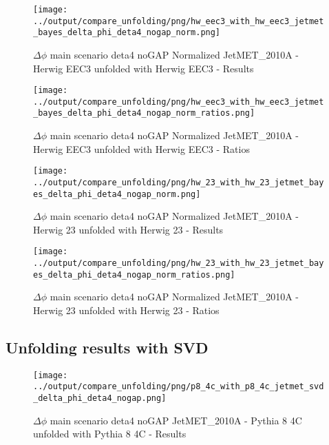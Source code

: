 \documentclass[11pt]{book}
\begin{document}
\begin{figure}[ht]
\centering
\texttt{[image: ../output/compare\_unfolding/png/hw\_eec3\_with\_hw\_eec3\_jetmet\_bayes\_delta\_phi\_deta4\_nogap\_norm.png]}
\caption{$\Delta\phi$ main scenario deta4 noGAP Normalized JetMET\_2010A - Herwig EEC3 unfolded with Herwig EEC3 - Results}
\label{hw_eec3_hw_eec3_jetmet_bayes_delta_phi_deta4_nogap_norm_a}
\end{figure}

\begin{figure}[ht]
\centering
\texttt{[image: ../output/compare\_unfolding/png/hw\_eec3\_with\_hw\_eec3\_jetmet\_bayes\_delta\_phi\_deta4\_nogap\_norm\_ratios.png]}
\caption{$\Delta\phi$ main scenario deta4 noGAP Normalized JetMET\_2010A - Herwig EEC3 unfolded with Herwig EEC3 - Ratios}
\label{hw_eec3_hw_eec3_jetmet_bayes_delta_phi_deta4_nogap_norm_b}
\end{figure}

\begin{figure}[ht]
\centering
\texttt{[image: ../output/compare\_unfolding/png/hw\_23\_with\_hw\_23\_jetmet\_bayes\_delta\_phi\_deta4\_nogap\_norm.png]}
\caption{$\Delta\phi$ main scenario deta4 noGAP Normalized JetMET\_2010A - Herwig 23 unfolded with Herwig 23 - Results}
\label{hw_23_hw_23_jetmet_bayes_delta_phi_deta4_nogap_norm_a}
\end{figure}

\begin{figure}[ht]
\centering
\texttt{[image: ../output/compare\_unfolding/png/hw\_23\_with\_hw\_23\_jetmet\_bayes\_delta\_phi\_deta4\_nogap\_norm\_ratios.png]}
\caption{$\Delta\phi$ main scenario deta4 noGAP Normalized JetMET\_2010A - Herwig 23 unfolded with Herwig 23 - Ratios}
\label{hw_23_hw_23_jetmet_bayes_delta_phi_deta4_nogap_norm_b}
\end{figure}


\clearpage
\subsection{Unfolding results with SVD}

\begin{figure}[ht]
\centering
\texttt{[image: ../output/compare\_unfolding/png/p8\_4c\_with\_p8\_4c\_jetmet\_svd\_delta\_phi\_deta4\_nogap.png]}
\caption{$\Delta\phi$ main scenario deta4 noGAP JetMET\_2010A - Pythia 8 4C unfolded with Pythia 8 4C - Results}
\label{p8_p8_jetmet_svd_delta_phi_deta4_nogap_a}
\end{figure}
\end{document}
